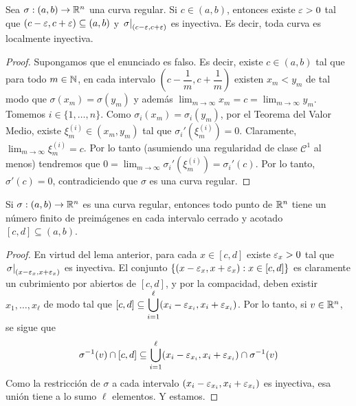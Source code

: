 \begin{lem}
Sea $\sigma:(a,b)\to\mathbb{R}^n$ una curva regular. Si $c\in (a,b)$, entonces existe $\varepsilon>0$ tal que $(c-\varepsilon,c+\varepsilon)\subseteq (a,b)$ y $\left.\sigma\right|_{(c-\varepsilon,c+\varepsilon)}$ es inyectiva. Es decir, toda curva es localmente inyectiva.
\begin{proof}
Supongamos que el enunciado es falso. Es decir, existe $c\in (a,b)$ tal que para todo $m\in\mathbb{N}$, en cada intervalo $\left(c-\dfrac{1}{m},c+\dfrac{1}{m}\right)$ existen $x_m<y_m$ de tal modo que $\sigma(x_m)=\sigma(y_m)$ y además $\displaystyle\lim_{m\to\infty}x_m = c = \displaystyle\lim_{m\to \infty}y_m$. Tomemos $i\in\{1,\ldots , n\}$. Como $\sigma_i(x_m)=\sigma_i(y_m)$, por el Teorema del Valor Medio, existe $\xi_m^{(i)}\in (x_m,y_m)$ tal que $\sigma_i'(\xi_m^{(i)})=0$. Claramente, $\lim_{m\to\infty}\xi_m^{(i)}=c$. Por lo tanto (asumiendo una regularidad de clase $\mathscr{C}^1$ al menos) tendremos que $0=\displaystyle\lim_{m\to\infty}\sigma_i'(\xi_m^{(i)})=\sigma_i'(c)$. Por lo tanto, $\sigma'(c)=0$, contradiciendo que $\sigma$ es una curva regular.
\end{proof}
\end{lem}

\begin{cor}
Si $\sigma:(a,b)\to\mathbb{R}^n$ es una curva regular, entonces todo punto de $\mathbb{R}^n$ tiene un número finito de preimágenes en cada intervalo cerrado y acotado $[c,d]\subseteq (a,b)$.
\begin{proof}
En virtud del lema anterior, para cada $x\in [c,d]$ existe $\varepsilon_x>0$ tal que $\left.\sigma\right|_{(x-\varepsilon_x,x+\varepsilon_x)}$ es inyectiva. El conjunto $\{(x-\varepsilon_x,x+\varepsilon_x) : x\in [c,d]\}$ es claramente un cubrimiento por abiertos de $[c,d]$, y por la compacidad, deben existir $x_1,\ldots , x_\ell$ de modo tal que $[c,d]\subseteq\displaystyle\bigcup_{i=1}^{\ell} (x_i-\varepsilon_{x_i},x_i+\varepsilon_{x_i})$. Por lo tanto, si $v\in\mathbb{R}^n$, se sigue que $$\sigma^{-1}(v)\cap [c,d] \subseteq \displaystyle\bigcup_{i=1}^\ell (x_i-\varepsilon_{x_i},x_i+\varepsilon_{x_i})\cap \sigma^{-1}(v)$$ Como la restricción de $\sigma$ a cada intervalo $(x_i-\varepsilon_{x_i},x_i+\varepsilon_{x_i})$ es inyectiva, esa unión tiene a lo sumo $\ell$ elementos. Y estamos.
\end{proof}
\end{cor}

